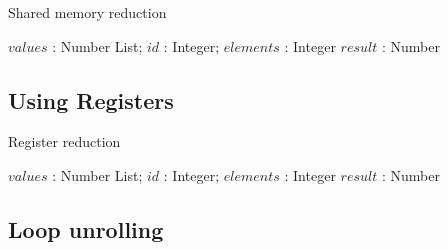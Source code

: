 \begin{algorithm}
  \caption{Shared memory reduction}
  \label{alg:sharedReduct}
  \begin{algorithmic}
              {$values$ : Number List; $id$ : Integer; $elements$ : Integer}
              {$result$ : Number}
              {
                \SYNC
                  \ENDIF
                  \SYNC
                \ENDWHILE
                \ENDIF
              }
  \end{algorithmic}
\end{algorithm}



\subsection{Using Registers}


\begin{algorithm}
  \caption{Register reduction}
  \label{alg:registerReduct}
  \begin{algorithmic}
              {$values$ : Number List; $id$ : Integer; $elements$ : Integer}
              {$result$ : Number}
              {
                \SYNC
                  \ENDIF
                  \SYNC
                \ENDWHILE
                \ENDIF
              }
  \end{algorithmic}
\end{algorithm}




\subsection{Loop unrolling}\label{sec:loopUnrolling}

